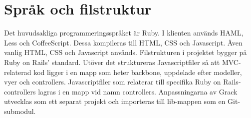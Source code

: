 \section{Språk och filstruktur}
Det huvudsakliga programmeringsspråket är Ruby. I klienten används HAML, Less och CoffeeScript. Dessa kompileras till HTML, CSS och Javascript. Även vanlig HTML, CSS och Javascript används.
Filstrukturen i projektet bygger på Ruby on Rails’ standard. Utöver det struktureras Javascriptfiler så att MVC-relaterad kod ligger i en mapp som heter backbone, uppdelade efter modeller, vyer och controllers. Javascriptfiler som relaterar till specifika Ruby on Rails-controllers lagras i en mapp vid namn controllers. 
Anpassningarna av Grack utvecklas som ett separat projekt och importeras till lib-mappen som en Git-submodul.
